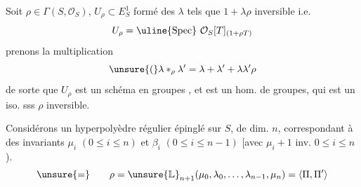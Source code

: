 Soit $\rho\in\Gamma(S,\mathcal O_S)$, $U_\rho\subset E^1_S$ formé des $\lambda$ tels que
$1+\lambda\rho$ inversible i.e.
\[
U_\rho=\uline{\operatorname{Spec}}\ \mathcal O_S[T]_{(1+\rho T)}
\]
prenons la multiplication
\[
\unsure{(}\lambda *_\rho\lambda'=\lambda+\lambda'+\lambda\lambda'\rho
\]
de sorte que $U_\rho$ est un schéma en groupes
, et
est un hom. de groupes, qui est un iso. sss $\rho$ inversible.

Considérons un hyperpolyèdre régulier  épinglé sur $S$, de dim. $n$,
correspondant à des invariants $\mu_i$ $(0\le i\le n)$ et $\beta_i$
$(0\le i\le n-1)$ [avec $\mu_i+1$ inv. $0\le i\le n$).
\[
\unsure{=}\qquad
\rho=\unsure{\mathbb L}_{n+1}(\mu_0,\lambda_0,\ldots,\lambda_{n-1},\mu_n)
=\langle\Pi,\Pi'\rangle
\]

